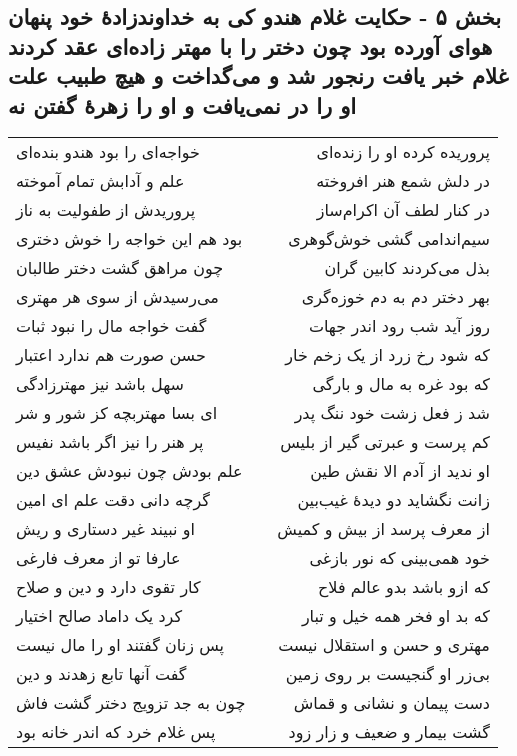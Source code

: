 \begin{center}
\section*{بخش ۵ - حکایت غلام هندو کی به خداوندزادهٔ خود پنهان هوای آورده بود چون دختر را با مهتر زاده‌ای عقد کردند غلام خبر یافت رنجور شد و می‌گداخت و هیچ طبیب علت او را در نمی‌یافت و او را زهرهٔ گفتن نه}
\label{sec:sh005}
\begin{longtable}{l p{0.5cm} r}
خواجه‌ای را بود هندو بنده‌ای
&&
پروریده کرده او را زنده‌ای
\\
علم و آدابش تمام آموخته
&&
در دلش شمع هنر افروخته
\\
پروریدش از طفولیت به ناز
&&
در کنار لطف آن اکرام‌ساز
\\
بود هم این خواجه را خوش دختری
&&
سیم‌اندامی گشی خوش‌گوهری
\\
چون مراهق گشت دختر طالبان
&&
بذل می‌کردند کابین گران
\\
می‌رسیدش از سوی هر مهتری
&&
بهر دختر دم به دم خوزه‌گری
\\
گفت خواجه مال را نبود ثبات
&&
روز آید شب رود اندر جهات
\\
حسن صورت هم ندارد اعتبار
&&
که شود رخ زرد از یک زخم خار
\\
سهل باشد نیز مهترزادگی
&&
که بود غره به مال و بارگی
\\
ای بسا مهتربچه کز شور و شر
&&
شد ز فعل زشت خود ننگ پدر
\\
پر هنر را نیز اگر باشد نفیس
&&
کم پرست و عبرتی گیر از بلیس
\\
علم بودش چون نبودش عشق دین
&&
او ندید از آدم الا نقش طین
\\
گرچه دانی دقت علم ای امین
&&
زانت نگشاید دو دیدهٔ غیب‌بین
\\
او نبیند غیر دستاری و ریش
&&
از معرف پرسد از بیش و کمیش
\\
عارفا تو از معرف فارغی
&&
خود همی‌بینی که نور بازغی
\\
کار تقوی دارد و دین و صلاح
&&
که ازو باشد بدو عالم فلاح
\\
کرد یک داماد صالح اختیار
&&
که بد او فخر همه خیل و تبار
\\
پس زنان گفتند او را مال نیست
&&
مهتری و حسن و استقلال نیست
\\
گفت آنها تابع زهدند و دین
&&
بی‌زر او گنجیست بر روی زمین
\\
چون به جد تزویج دختر گشت فاش
&&
دست پیمان و نشانی و قماش
\\
پس غلام خرد که اندر خانه بود
&&
گشت بیمار و ضعیف و زار زود
\\

\end{longtable}
\end{center}
